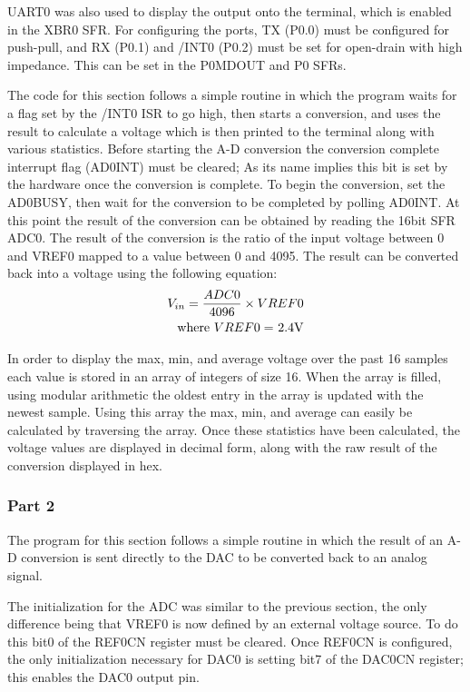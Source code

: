 \documentclass[12pt]{article}
\begin{document}
UART0 was also used to display the output onto the terminal, which is enabled in the XBR0 SFR. For configuring the ports, TX (P0.0) must be configured for push-pull, and RX (P0.1) and /INT0 (P0.2) must be set for open-drain with high impedance. This can be set in the P0MDOUT and P0 SFRs.

The code for this section follows a simple routine in which the program waits for a flag set by the /INT0  ISR to go high, then starts a conversion, and uses the result to calculate a voltage which is then printed to the terminal along with various statistics. Before starting the A-D conversion the conversion complete interrupt flag (AD0INT) must be cleared; As its name implies this bit is set by the hardware once the conversion is complete. To begin the conversion, set the AD0BUSY, then wait for the conversion to be completed by polling AD0INT. At this point the result of the conversion can be obtained by reading the 16bit SFR ADC0. The result of the conversion is the ratio of the input voltage between 0 and VREF0 mapped to a value between 0 and 4095. The result can be converted back into a voltage using the following equation:
\begin{align*}
V_{in} = \frac{ADC0}{4096} \times VREF0\\\text{where $VREF0 =$ 2.4\si{V}}
\end{align*}

In order to display the max, min, and average voltage over the past 16 samples each value is stored in an array of integers of size 16. When the array is filled, using modular arithmetic the oldest entry in the array is updated with the newest sample. Using this array the max, min, and average can easily be calculated by traversing the array. Once these statistics have been calculated, the voltage values are displayed in decimal form, along with the raw result of the conversion displayed in hex. 

\subsubsection{Part 2}

The program for this section follows a simple routine in which the result of an A-D conversion is sent directly to the DAC to be converted back to an analog signal. 

The initialization for the ADC was similar to the previous section, the only difference being that VREF0 is now defined by an external voltage source. To do this bit0 of the REF0CN register must be cleared. Once REF0CN is configured, the only initialization necessary for DAC0 is setting bit7 of the DAC0CN register; this enables the DAC0 output pin.
\end{document}
